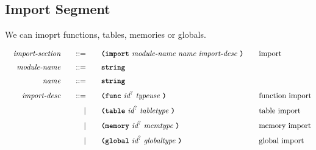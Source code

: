 \subsection{Import Segment}

We can imoprt functions, tables, memories or globals.

\begin{alignat*}{9}
    && \textit{import-section}    &&\quad ::= &\quad && \textbf{\texttt{(import}}\ \textit{module-name}\ \textit{name}\ \textit{import-desc}\ \textbf{\texttt{)}}  \quad && \textrm{import} \\[1mm]
    && \textit{module-name}       &&\quad ::= &\quad && \textbf{\texttt{string}} &&\\[1mm]
    && \textit{name}              &&\quad ::= &\quad && \textbf{\texttt{string}} &&\\[1mm]
    && \textit{import-desc}       &&\quad ::= &\quad && \textbf{\texttt{(func}}\ \textit{id}^?\ \textit{typeuse}\ \textbf{\texttt{)}}  \quad && \textrm{function import} \\[1mm]
    &&                            &&\quad  |  &\quad && \textbf{\texttt{(table}}\ \textit{id}^?\ \textit{tabletype}\ \textbf{\texttt{)}}  \quad && \textrm{table import} \\[1mm]
    &&                            &&\quad  |  &\quad && \textbf{\texttt{(memory}}\ \textit{id}^?\ \textit{memtype}\ \textbf{\texttt{)}}  \quad && \textrm{memory import} \\[1mm]
    &&                            &&\quad  |  &\quad && \textbf{\texttt{(global}}\ \textit{id}^?\ \textit{globaltype}\ \textbf{\texttt{)}}  \quad && \textrm{global import} \\[1mm]
\end{alignat*}
